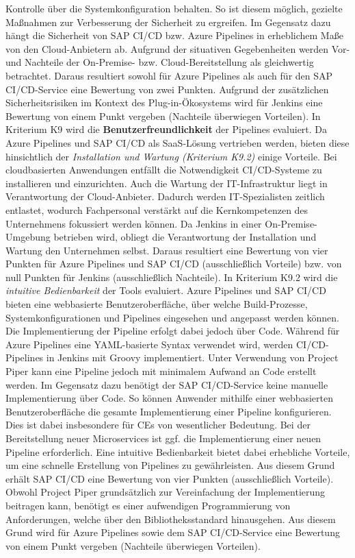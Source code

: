 Kontrolle über die Systemkonfiguration behalten. So ist diesem möglich, gezielte Maßnahmen zur Verbesserung der Sicherheit zu ergreifen. Im Gegensatz dazu hängt die Sicherheit von SAP CI/CD bzw. Azure Pipelines in erheblichem Maße von den Cloud-Anbietern ab. Aufgrund der situativen Gegebenheiten werden Vor- und Nachteile der On-Premise- bzw. Cloud-Bereitstellung als gleichwertig betrachtet. Daraus resultiert sowohl für Azure Pipelines als auch für den SAP CI/CD-Service eine Bewertung von zwei Punkten. Aufgrund der zusätzlichen Sicherheitsrisiken im Kontext des Plug-in-Ökosystems wird für Jenkins eine Bewertung von einem Punkt vergeben (Nachteile überwiegen Vorteilen). In Kriterium K9 wird die \textbf{Benutzerfreundlichkeit} der Pipelines evaluiert. Da Azure Pipelines und SAP CI/CD als SaaS-Lösung vertrieben werden, bieten diese hinsichtlich der \textit{Installation und Wartung (Kriterium K9.2)} einige Vorteile. Bei cloudbasierten Anwendungen entfällt die Notwendigkeit CI/CD-Systeme zu installieren und einzurichten. Auch die Wartung der IT-Infrastruktur liegt in Verantwortung der Cloud-Anbieter. Dadurch werden IT-Spezialisten zeitlich entlastet, wodurch Fachpersonal verstärkt auf die Kernkompetenzen des Unternehmens fokussiert werden können. Da Jenkins in einer On-Premise-Umgebung betrieben wird, obliegt die Verantwortung der Installation und Wartung den Unternehmen selbst. Daraus resultiert eine Bewertung von vier Punkten für Azure Pipelines und SAP CI/CD (ausschließlich Vorteile) bzw. von null Punkten für Jenkins (ausschließlich Nachteile). In Kriterium K9.2 wird die \textit{intuitive Bedienbarkeit} der Tools evaluiert. Azure Pipelines und SAP CI/CD bieten eine webbasierte Benutzeroberfläche, über welche Build-Prozesse, Systemkonfigurationen und Pipelines eingesehen und angepasst werden können. Die Implementierung der Pipeline erfolgt dabei jedoch über Code. Während für Azure Pipelines eine YAML-basierte Syntax verwendet wird, werden CI/CD-Pipelines in Jenkins mit Groovy implementiert. Unter Verwendung von Project Piper kann eine Pipeline jedoch mit minimalem Aufwand an Code erstellt werden. Im Gegensatz dazu benötigt der SAP CI/CD-Service keine manuelle Implementierung über Code. So können Anwender mithilfe einer webbasierten Benutzeroberfläche die gesamte Implementierung einer Pipeline konfigurieren. Dies ist dabei insbesondere für CEs von wesentlicher Bedeutung. Bei der Bereitstellung neuer Microservices ist ggf. die Implementierung einer neuen Pipeline erforderlich. Eine intuitive Bedienbarkeit bietet dabei erhebliche Vorteile, um eine schnelle Erstellung von Pipelines zu gewährleisten. Aus diesem Grund erhält SAP CI/CD eine Bewertung von vier Punkten (ausschließlich Vorteile). Obwohl Project Piper grundsätzlich zur Vereinfachung der Implementierung beitragen kann, benötigt es einer aufwendigen Programmierung von Anforderungen, welche über den Bibliotheksstandard hinausgehen. Aus diesem Grund wird für Azure Pipelines sowie dem SAP CI/CD-Service eine Bewertung von einem Punkt vergeben (Nachteile überwiegen Vorteilen).
